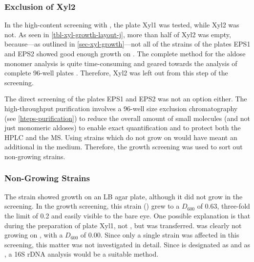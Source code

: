 \subsubsection{Exclusion of Xyl2}
In the high-content screening with \xyl{}, the plate Xyl1 was tested, while Xyl2 was not. As seen in \vref{tbl-xyl-growth-layout-j}, more than half of Xyl2 was empty, because---as outlined in \vref{sec-xyl-growth}---not all of the strains of the plates EPS1 and EPS2 showed good enough growth on \xyl{}. The complete method for the aldose monomer analysis is quite time-consuming and geared towards the analysis of complete 96-well plates \cite{Ruehmann2015a}. Therefore, Xyl2 was left out from this step of the screening.

The direct screening of the plates EPS1 and EPS2 was not an option either. The high-throughput purification involves a 96-well size exclusion chromatography (see \vref{hteps-purification}) to reduce the overall amount of small molecules (and not just monomeric aldoses) to enable exact quantification and to protect both the HPLC and the MS. Using strains which do not grow on \xyl{} would have meant an additional  \xyl{} in the medium. Therefore, the \xyl{} growth screening was used to sort out non-growing strains.

\subsubsection{Non-Growing Strains}
The strain  showed growth on an LB agar plate, although it did not grow in the screening. In the \xyl{} growth screening, this strain () grew to a $D_{600}$ of \num{0.63}, three-fold the limit of \num{0.2} and easily visible to the bare eye. One possible explanation is that during the preparation of plate Xyl1, not , but  was transferred.  was clearly not growing on \xyl{}, with a $D_{600}$ of \num{0.00}. Since only a single strain was affected in this screening, this matter was not investigated in detail. Since  is designated as  and  as , a 16S rDNA analysis would be a suitable method.

